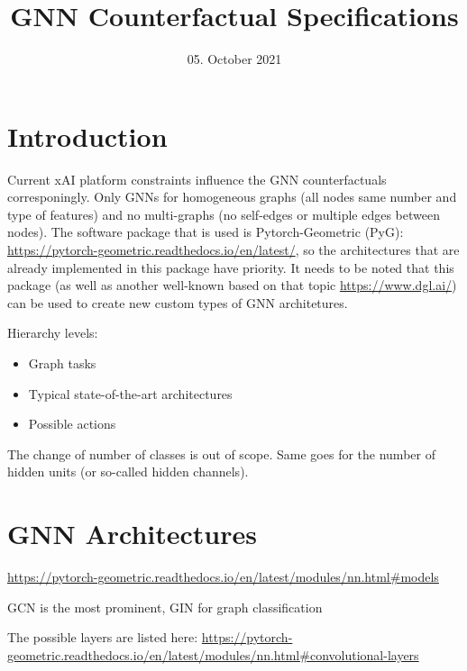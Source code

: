\documentclass[12p3, letterpaper, twoside]{article}
\title{GNN Counterfactual Specifications}
\date{05. October 2021}
\begin{document}
\begin{titlepage}
\maketitle
\end{titlepage}

\section{Introduction}

Current xAI platform constraints influence the GNN counterfactuals corresponingly. Only GNNs for homogeneous graphs (all nodes same number and type of features) and no multi-graphs (no self-edges or multiple edges between nodes). The software package that is used is 
Pytorch-Geometric (PyG):\\ 
\url{https://pytorch-geometric.readthedocs.io/en/latest/}, so the architectures that are already implemented in this package have priority. It needs to be noted that this package (as well as another well-known based on that topic \url{https://www.dgl.ai/}) can be used to create new custom types of GNN architetures. 

Hierarchy levels:

\begin{itemize}
	\item Graph tasks
	\item Typical state-of-the-art architectures
	\item Possible actions
\end{itemize}

The change of number of classes is out of scope. Same goes for the number of hidden units (or so-called hidden channels).

\section{GNN Architectures}

\url{https://pytorch-geometric.readthedocs.io/en/latest/modules/nn.html#models}

GCN is the most prominent, GIN for graph classification

The possible layers are listed here: \url{https://pytorch-geometric.readthedocs.io/en/latest/modules/nn.html#convolutional-layers}


\end{document}
